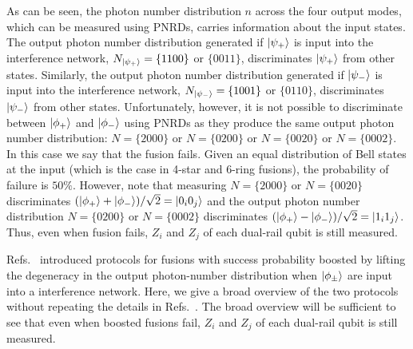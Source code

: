 \documentclass[reprint,
groupedaddress,
 prl,amsmath,amssymb,
 aps]{revtex4-2}
\theoremstyle{definition}
\begin{document}
\begin{bibunit}
As can be seen, the photon number distribution $n$ across the four output modes, which can be measured using PNRDs, carries information about the input states. The output photon number distribution generated if $\ket{\psi_+}$ is input into the interference network, $N_{\ket{\psi_+}}=\{1100\}$ or $\{0011\}$, discriminates $\ket{\psi_+}$ from other states. Similarly, the output photon number distribution generated if $\ket{\psi_-}$ is input into the interference network, $N_{\ket{\psi_-}}=\{1001\}$ or $\{0110\}$, discriminates $\ket{\psi_-}$ from other states. Unfortunately, however, it is not possible to discriminate between $\ket{\phi_+}$ and $\ket{\phi_-}$ using PNRDs as they produce the same output photon number distribution: $N=\{2000\}$ or $N=\{0200\}$ or $N=\{0020\}$ or $N=\{0002\}$. In this case we say that the fusion fails. Given an equal distribution of Bell states at the input (which is the case in 4-star and 6-ring fusions), the probability of failure is $50\%$. However, note that measuring $N=\{2000\}$ or $N=\{0020\}$ discriminates $(\ket{\phi_+}+\ket{\phi_-})/\sqrt{2}=\ket{0_i0_j}$ and the output photon number distribution $N=\{0200\}$ or $N=\{0002\}$ discriminates $(\ket{\phi_+}-\ket{\phi_-})/\sqrt{2}=\ket{1_i1_j}$. Thus, even when fusion fails, $Z_i$ and $Z_j$ of each dual-rail qubit is still measured. 

Refs.~\cite{grice2011arbitrarily,ewert20143} introduced protocols for fusions with success probability boosted by lifting the degeneracy in the output photon-number distribution when $\ket{\phi_\pm}$ are input into a interference network. Here, we give a broad overview of the two protocols without repeating the details in Refs.~\cite{grice2011arbitrarily,ewert20143}. The broad overview will be sufficient to see that even when boosted fusions fail, $Z_i$ and $Z_j$ of each dual-rail qubit is still measured.



\end{bibunit}
\end{document}
